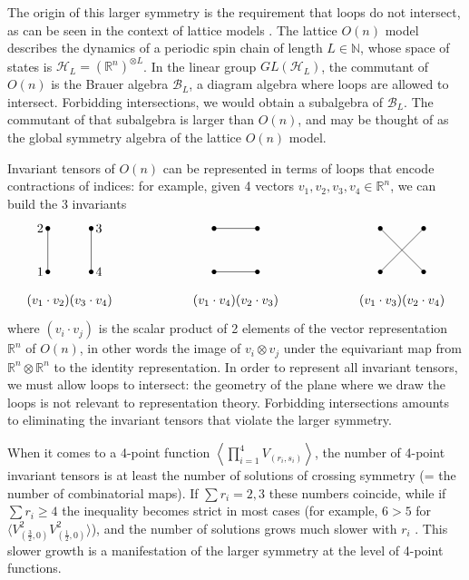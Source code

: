 \documentclass[12pt, a4paper]{article}
\newcommand{\vertices}{
\coordinate (base) at (0, 1);
\draw (0, 0) node[fill, circle, minimum size = 1.3mm, inner sep = 0]{};
  \draw (3, 0) node[fill, circle, minimum size = 1.3mm, inner sep = 0]{};
  \draw (0, 3) node[fill, circle, minimum size = 1.3mm, inner sep = 0]{};
  \draw (3, 3) node[fill, circle, minimum size = 1.3mm, inner sep = 0]{};
}
\begin{document}
The origin of this larger symmetry is the requirement that loops do not intersect, as can be seen in the context of lattice models \cite{jrs22}. The lattice $O(n)$ model describes the dynamics of a periodic spin chain of length $L\in\mathbb{N}$, whose space of states is $\mathcal{H}_L=\left(\mathbb{R}^n\right)^{\otimes L}$. In the linear group $GL(\mathcal{H}_L)$, the commutant of $O(n)$ is the Brauer algebra $\mathcal{B}_L$, a diagram algebra where loops are allowed to intersect. Forbidding intersections, we would obtain a subalgebra of $\mathcal{B}_L$. The commutant of that subalgebra is larger than $O(n)$, and may be thought of as the global symmetry algebra of the lattice $O(n)$ model.

Invariant tensors of $O(n)$ can be represented in terms of loops that encode contractions of indices: for example, given 4 vectors $v_1,v_2,v_3,v_4\in \mathbb{R}^n$, we can build the 3 invariants 
\begin{align}
\begin{tikzpicture}[baseline=(base), scale = .4]
  \vertices
  \draw (0, 0) node [left]{$1$} -- (0, 3) node[left]{$2$};
  \draw (3, 0) node [right]{$4$} -- (3, 3) node[right]{$3$};
  \node at (1.5, -2) {$(v_1\cdot v_2)(v_3\cdot v_4)$};
 \end{tikzpicture}
 \hspace{2cm}
 \begin{tikzpicture}[baseline=(base), scale = .4]
  \vertices
 \draw (0, 3) -- (3, 3) ;
 \draw (0,0) -- (3,0);
 \node at (1.5, -2) {$(v_1\cdot v_4)(v_2\cdot v_3)$};
 \end{tikzpicture}
 \hspace{2cm}
 \begin{tikzpicture}[baseline=(base), scale = .4]
  \vertices
 \draw (0, 3) -- (3, 0) ;
  \draw (3, 3) -- (0, 0);
  \node at (1.5, -2) {$(v_1\cdot v_3)(v_2\cdot v_4)$};
 \end{tikzpicture}
\end{align}
where $(v_i\cdot v_j)$ is the scalar product of 2 elements of the vector representation $\mathbb{R}^n$ of $O(n)$, in other words the image of $v_i\otimes v_j$ under the equivariant map from $\mathbb{R}^n\otimes \mathbb{R}^n$ to the identity representation. In order to represent all invariant tensors, we must allow loops to intersect: the geometry of the plane where we draw the loops is not relevant to representation theory. Forbidding intersections amounts to eliminating the invariant tensors that violate the larger symmetry. 

When it comes to a 4-point function $\left<\prod_{i=1}^4 V_{(r_i,s_i)}\right>$, the number of 4-point invariant tensors is at least the number of solutions of crossing symmetry (= the number of combinatorial maps). If $\sum r_i = 2, 3$ these numbers coincide, while if $\sum r_i\geq 4$ the inequality becomes strict in most cases (for example, $6>5$ for $\big\langle V_{(\frac32,0)}^2V_{(\frac12,0)}^2\big\rangle$), and the number of solutions grows much slower with $r_i$ \cite{gjnrs23}. This slower growth is a manifestation of the larger symmetry at the level of 4-point functions.
\end{document}
